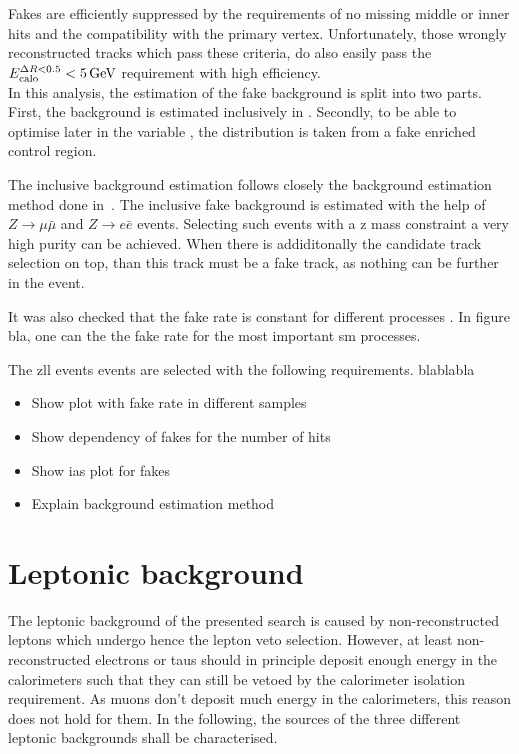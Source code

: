 Fakes are efficiently suppressed by the requirements of no missing middle or inner hits and the compatibility with the primary vertex.
Unfortunately, those wrongly reconstructed tracks which pass these criteria, do also easily pass the $E^{\Delta R<0.5}_{\text{calo}}<5\,\text{Ge}\kern-0.06667em\text{V}$ requirement with high efficiency.\\

In this analysis, the estimation of the fake background is split into two parts.
First, the background is estimated inclusively in \ias.
Secondly, to be able to optimise later in the variable \ias, the \ias distribution is taken from a fake enriched control region.

The inclusive background estimation follows closely the background estimation method done in~\cite{bib:CMS:DT_Thesis,bib:CMS:DT_8TeV_AN}.
The inclusive fake background is estimated with the help of $Z\rightarrow\mu\bar{\mu}$ and $Z\rightarrow e\bar{e}$  events.
Selecting such events with a z mass constraint a very high purity can be achieved.
When there is addiditonally the candidate track selection on top, than this track must be a fake track, as nothing can be further in the event.

It was also checked that the fake rate is constant for different processes .
In figure bla, one can the the fake rate for the most important sm processes.

The zll events events are selected with the following requirements.
blablabla

\begin{itemize}
\item Show plot with fake rate in different samples
\item Show dependency of fakes for the number of hits
\item Show ias plot for fakes
\item Explain background estimation method
\end{itemize}

\section{Leptonic background}
\label{sec:LeptonicBkg}

The leptonic background of the presented search is caused by non-reconstructed leptons which undergo hence the lepton veto selection.
However, at least non-reconstructed electrons or taus should in principle deposit enough energy in the calorimeters such that they can still be vetoed by the calorimeter isolation requirement.
As muons don't deposit much energy in the calorimeters, this reason does not hold for them.
In the following, the sources of the three different leptonic backgrounds shall be characterised.

